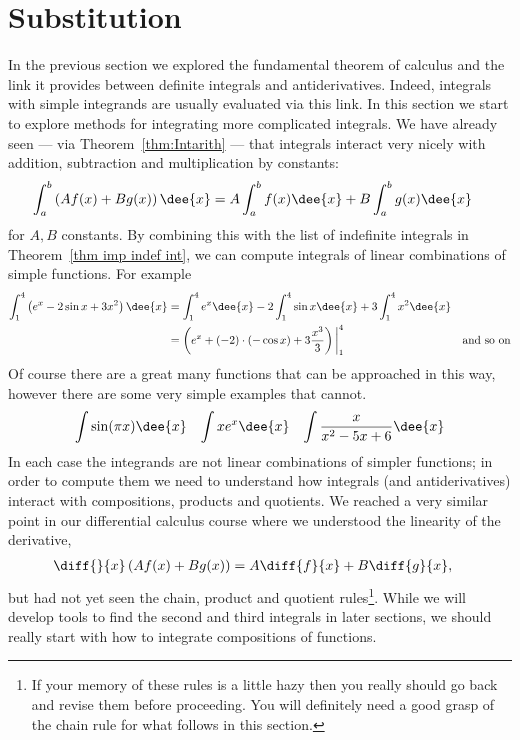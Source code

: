 \section{Substitution}\label{sec subs}
In the previous section we explored the fundamental theorem of calculus and the link it
provides between definite integrals and antiderivatives. Indeed, integrals with simple
integrands are usually evaluated via this link. In this section we start to explore
methods for integrating more complicated integrals. We have already seen ---
via Theorem~\ref{thm:Intarith} --- that integrals interact very nicely with
addition, subtraction and multiplication by constants:
\begin{align*}
  \int_a^b \left( Af(x) + B g(x) \right) \dee{x}
  &= A\int_a^b f(x)\dee{x} + B\int_a^b g(x)\dee{x}
\end{align*}
for $A,B$ constants. By combining this with the list of indefinite integrals in
Theorem~\ref{thm imp indef int}, we can compute integrals of linear combinations of
simple functions. For example
\begin{align*}
  \int_1^4\left(e^x - 2\sin x + 3x^2 \right)\dee{x}
  &= \int_1^4e^x\dee{x} -2\int_1^4 \sin x \dee{x} +3 \int_1^4x^2 \dee{x}\\
  &= \left(e^x  + (-2)\cdot(-\cos x) + 3\frac{x^3}{3} \right)\bigg|_1^4
&\text{and so on}
\end{align*}
Of course there are a great many functions that can be approached in this way, however
there are some very simple examples that cannot.
\begin{align*}
  \int \sin(\pi x) \dee{x}
  && \int x e^x \dee{x}
  && \int \frac{x}{x^2-5x+6}\dee{x}
\end{align*}
In each case the integrands are not linear combinations of simpler functions; in order to
compute them we need to understand how integrals (and antiderivatives) interact with
compositions, products and quotients. We reached a very similar point in our differential
calculus course where we understood the linearity of the derivative,
\begin{align*}
  \diff{}{x}\left(Af(x)+ Bg(x)\right) &= A\diff{f}{x} + B\diff{g}{x},
\end{align*}
but had not yet seen the chain, product and quotient rules\footnote{If your memory of
these rules is a little hazy then you really should go back and revise them before
proceeding. You will definitely need a good grasp of the chain rule for what follows in
this section.}. While we will develop tools to find the second and third integrals in
later sections, we should really start with how to integrate compositions of functions.

